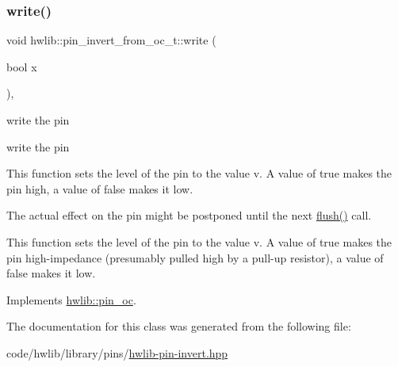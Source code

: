 \mbox{\label{classhwlib_1_1pin__invert__from__oc__t_a60831a081f8f796a47e41a87bef8a398}} 
\subsubsection{\texorpdfstring{write()}{write()}}
{\footnotesize\ttfamily void hwlib\+::pin\+\_\+invert\+\_\+from\+\_\+oc\+\_\+t\+::write (\begin{DoxyParamCaption}\item[{bool}]{x }\end{DoxyParamCaption})\hspace{0.3cm}{\ttfamily [inline]}, {\ttfamily [virtual]}}





write the pin

write the pin

This function sets the level of the pin to the value v. A value of true makes the pin high, a value of false makes it low.

The actual effect on the pin might be postponed until the next \hyperlink{classhwlib_1_1pin__invert__from__oc__t_ad470fa699bc65083d65190ff22efe600}{flush()} call.

This function sets the level of the pin to the value v. A value of true makes the pin high-\/impedance (presumably pulled high by a pull-\/up resistor), a value of false makes it low. 

Implements \hyperlink{classhwlib_1_1pin__oc_a4429dd7dc80858a213bb157f4ac5def3}{hwlib\+::pin\+\_\+oc}.



The documentation for this class was generated from the following file\+:\begin{DoxyCompactItemize}
\item 
code/hwlib/library/pins/\hyperlink{hwlib-pin-invert_8hpp}{hwlib-\/pin-\/invert.\+hpp}\end{DoxyCompactItemize}
